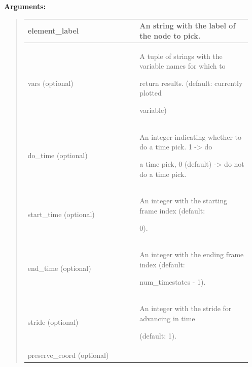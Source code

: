 \documentclass[letterpaper,10pt,english]{sphinxmanual}
\begin{document}
\begin{DUlineblock}{0em}
\item[] 
\item[] \textbf{Arguments:}
\end{DUlineblock}
\begin{quote}

\begin{tabular}{|p{0.475\linewidth}|p{0.475\linewidth}|}
\hline

element\_label
 & 
An string with the label of the node to pick.
\\
\hline
vars (optional)
 & 
\begin{DUlineblock}{0em}
\item[] A tuple of strings with the variable names for which to
\item[] return results. (default: currently plotted
\item[] variable)
\end{DUlineblock}
\\
\hline
do\_time (optional)
 & 
\begin{DUlineblock}{0em}
\item[] An integer indicating whether to do a time pick. 1 -\textgreater{} do
\item[] a time pick, 0 (default) -\textgreater{} do not do a time pick.
\end{DUlineblock}
\\
\hline
start\_time (optional)
 & 
\begin{DUlineblock}{0em}
\item[] An integer with the starting frame index (default:
\item[] 0).
\end{DUlineblock}
\\
\hline
end\_time (optional)
 & 
\begin{DUlineblock}{0em}
\item[] An integer with the ending frame index (default:
\item[] num\_timestates - 1).
\end{DUlineblock}
\\
\hline
stride (optional)
 & 
\begin{DUlineblock}{0em}
\item[] An integer with the stride for advancing in time
\item[] (default: 1).
\end{DUlineblock}
\\
\hline
preserve\_coord (optional)
 & 
\begin{DUlineblock}{0em}

\end{DUlineblock}
\end{tabular}
\end{quote}
\end{document}
